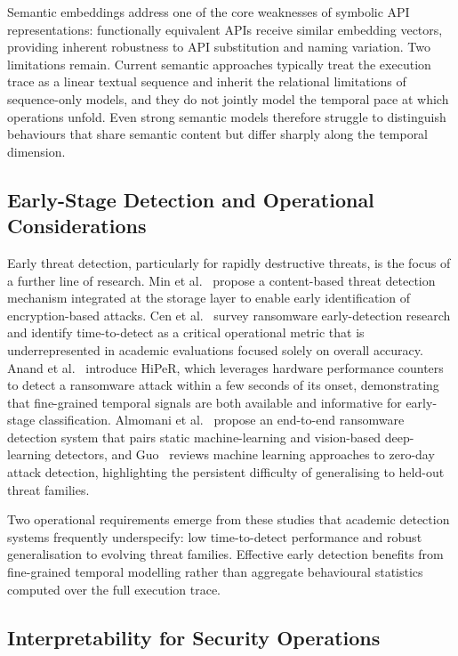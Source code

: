 \documentclass[%
    BCOR=10mm,
    DIV=13,
    toc=bibliography,
    toc=listof,
    oneside,
    12pt,
]{scrbook}
\begin{document}
Semantic embeddings address one of the core weaknesses of symbolic API
representations: functionally equivalent APIs receive similar embedding
vectors, providing inherent robustness to API substitution and naming
variation. Two limitations remain. Current semantic approaches typically treat
the execution trace as a linear textual sequence and inherit the relational
limitations of sequence-only models, and they do not jointly model the
temporal pace at which operations unfold. Even strong semantic models
therefore struggle to distinguish behaviours that share semantic content but
differ sharply along the temporal dimension.

\subsection{Early-Stage Detection and Operational Considerations}
\label{subsec:early_stage}

Early threat detection, particularly for rapidly destructive threats, is the
focus of a further line of research. Min et al.~\cite{min2018content} propose a
content-based threat detection mechanism integrated at the storage layer to
enable early identification of encryption-based attacks. Cen et
al.~\cite{cen2021ransomware} survey ransomware early-detection research and
identify time-to-detect as a critical operational metric that is
underrepresented in academic evaluations focused solely on overall accuracy.
Anand et al.~\cite{anand2022hiper} introduce HiPeR, which leverages hardware
performance counters to detect a ransomware attack within a few seconds of its
onset, demonstrating that fine-grained temporal signals are both available and
informative for early-stage classification. Almomani et al.~\cite{almomani2021}
propose an end-to-end ransomware detection system that pairs static
machine-learning and vision-based deep-learning detectors, and
Guo~\cite{guo2023zeroday} reviews machine learning approaches to zero-day
attack detection, highlighting the persistent difficulty of generalising to
held-out threat families.

Two operational requirements emerge from these studies that academic detection
systems frequently underspecify: low time-to-detect performance and robust
generalisation to evolving threat families. Effective early detection benefits
from fine-grained temporal modelling rather than aggregate behavioural
statistics computed over the full execution trace.

\subsection{Interpretability for Security Operations}
\label{subsec:interpretability}
\end{document}
